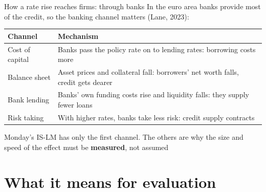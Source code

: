 \documentclass[aspectratio=169,xcolor=table]{beamer}
\begin{document}
\begin{frame}{How a rate rise reaches firms: through banks}
\small
In the euro area banks provide most of the credit, so the banking channel matters (Lane, 2023):
\vspace{0.1cm}

\centering\footnotesize
\begin{tabular}{L{3.2cm}L{9.4cm}}
\toprule
\textbf{Channel} & \textbf{Mechanism}\\
\midrule
Cost of capital & Banks pass the policy rate on to lending rates: borrowing costs more \\
Balance sheet & Asset prices and collateral fall: borrowers' net worth falls, credit gets dearer \\
Bank lending & Banks' own funding costs rise and liquidity falls: they supply fewer loans \\
Risk taking & With higher rates, banks take less risk: credit supply contracts \\
\bottomrule
\end{tabular}
\vspace{0.15cm}

\raggedright\small
Monday's IS-LM has only the first channel. The others are why the size and speed of the effect must be \textbf{measured}, not assumed
\end{frame}

\section{What it means for evaluation}
\end{document}
